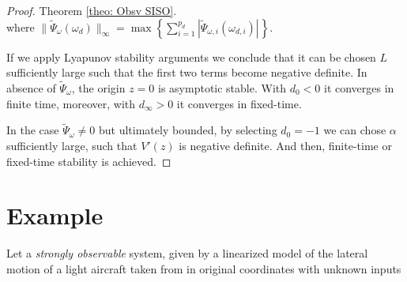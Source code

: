 \documentclass[11pt,letterpaper,twoside,openright]{report}
\newcommand{\abs}[2]{|#1|^{#2}}
\providecommand{\norm}[1]{\lVert#1\rVert}
\begin{document}
\begin{proof}{Theorem \ref{theo: Obsv SISO}. \\}
	where $\norm{\tilde{\Psi}_{\omega}(\omega_d)}_{\infty}=\max \left\lbrace \sum_{i=1}^{p_d} \abs{ \tilde{\Psi}_{\omega,i}(\omega_{d,i}) }{} \right\rbrace$.
	
	If we apply Lyapunov stability arguments we conclude that it can be chosen $L$ sufficiently large such that the first two terms become negative definite. In absence of $\tilde{\Psi}_{\omega}$, the origin $z=0$ is asymptotic stable. With $d_0<0$ it converges in finite time, moreover, with $d_{\infty}>0$ it converges in fixed-time.
	
	In the case $\tilde{\Psi}_{\omega}\neq 0$ but ultimately bounded, by selecting $d_0=-1$ we can chose $\alpha$ sufficiently large, such that $V'(z)$ is negative definite. And then, finite-time or fixed-time stability is achieved. 
\end{proof}

\section{Example}
Let a \textit{strongly observable} system, given by a linearized model of the lateral motion of a light aircraft taken from \cite{Mudge1988}\cite{Niederwieser2021} in original coordinates with unknown inputs
\end{document}
